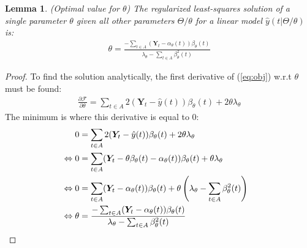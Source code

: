 \documentclass[10pt]{proc}
\newtheorem{lemma}{Lemma}
\newtheorem{proof}{Proof}
\begin{document}
\begin{lemma}
    (Optimal value for $\theta$) The regularized least-squares solution of a
    single parameter $\theta$ given all other parameters $\Theta / {\theta}$ for
    a linear model $\hat{y}(t| \Theta / {\theta})$ is:
    \begin{align}  \label{eq:theta-update}
        \theta =
            \frac{-\sum_{t \in A} (\bm{Y}_t - \alpha_\theta(t)) \beta_\theta(t)}
                 {\lambda_\theta - \sum_{t \in A} \beta_\theta^2(t)}
    \end{align}
\end{lemma}

\begin{proof}
    To find the solution analytically, the first derivative of (\ref{eq:obj})
    w.r.t $\theta$ must be found:
    \begin{align} \label{eq:ipr-obj-derivative}
        \frac{ \partial \mathcal{F}}{ \partial\theta } =
            \sum_{t \in A} 2(\bm{Y}_t - \hat{y}(t)) \beta_\theta(t) +
            2\theta\lambda_\theta
    \end{align}
    The minimum is where this derivative is equal to 0:
    \begin{align*}
        & \hphantom{==} \begin{aligned}[t]
            0 &=
            \sum_{t \in A} 2(\bm{Y}_t - \hat{y}(t)) \beta_\theta(t) +
            2\theta\lambda_\theta
        \end{aligned} \\
        & \Leftrightarrow \begin{aligned}[t]
            0 &=
            \sum_{t \in A} (\bm{Y}_t - \theta\beta_\theta(t) - \alpha_\theta(t))
                \beta_\theta(t) +
                \theta\lambda_\theta
        \end{aligned} \\
        & \Leftrightarrow \begin{aligned}[t]
            0 &=
            \sum_{t \in A} (\bm{Y}_t - \alpha_\theta(t)) \beta_\theta(t) +
            \theta \left(\lambda_\theta - \sum_{t \in A} \beta_\theta^2(t)\right)
        \end{aligned} \\
        & \Leftrightarrow \begin{aligned}[t]
            \theta &=
                \frac{-\sum_{t \in A} (\bm{Y}_t - \alpha_\theta(t)) \beta_\theta(t)}
                     {\lambda_\theta - \sum_{t \in A} \beta_\theta^2(t)}
        \end{aligned}
    \end{align*}
\end{proof}
\end{document}
